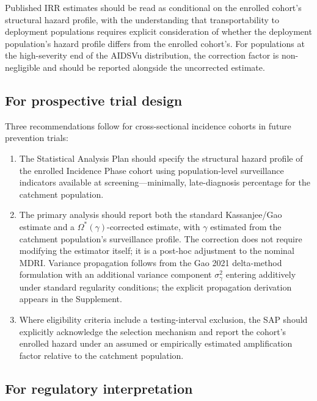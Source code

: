 \documentclass[12pt]{article}
\begin{document}
Published IRR estimates should be read as conditional on the enrolled cohort's structural hazard profile, with the understanding that transportability to deployment populations requires explicit consideration of whether the deployment population's hazard profile differs from the enrolled cohort's. For populations at the high-severity end of the AIDSVu distribution, the correction factor is non-negligible and should be reported alongside the uncorrected estimate.

\subsection{For prospective trial design}

Three recommendations follow for cross-sectional incidence cohorts in future prevention trials:

\begin{enumerate}
\item[(i)] The Statistical Analysis Plan should specify the structural hazard profile of the enrolled Incidence Phase cohort using population-level surveillance indicators available at screening---minimally, late-diagnosis percentage for the catchment population.

\item[(ii)] The primary analysis should report both the standard Kassanjee/Gao estimate and a $\Omega^*(\gamma)$-corrected estimate, with $\gamma$ estimated from the catchment population's surveillance profile. The correction does not require modifying the estimator itself; it is a post-hoc adjustment to the nominal MDRI. Variance propagation follows from the Gao 2021 delta-method formulation with an additional variance component $\sigma_\gamma^2$ entering additively under standard regularity conditions; the explicit propagation derivation appears in the Supplement.

\item[(iii)] Where eligibility criteria include a testing-interval exclusion, the SAP should explicitly acknowledge the selection mechanism and report the cohort's enrolled hazard under an assumed or empirically estimated amplification factor relative to the catchment population.
\end{enumerate}

\subsection{For regulatory interpretation}
\end{document}
